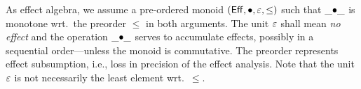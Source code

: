 \documentclass[acmsmall,review,anonymous]{acmart}\settopmatter{printfolios=true,printccs=false,printacmref=false}
\begin{document}
\newcommand{\tTm}{\mathsf{Tm}}
\newcommand{\Tm}[1]{\tTm^{#1}}
\newcommand{\PTm}{\Tm+}
\newcommand{\NTm}{\Tm-}
\newcommand{\tthunk}{\mathsf{thunk}}
\newcommand{\thunk}[1]{\tthunk\,#1}
\newcommand{\tforce}{\mathsf{force}}
\newcommand{\force}[1]{\tforce\,#1}
\newcommand{\tin}[1]{\mathsf{in}_{#1}}
\newcommand{\inj}[2]{\tin{#1}\,#2}
\newcommand{\ttup}[1]{\mathsf{tup}^{#1}}
\newcommand{\tup}[2]{\ttup{#1}\,{#2}}
\newcommand{\ptup}[1]{\ttup\,{#1}}
\newcommand{\ntup}[1]{\ttup{-}\,{#1}}
\newcommand{\tret}{\mathsf{ret}}
\newcommand{\ret}[1]{\tret\,#1}
\newcommand{\vlet}[3]{#2\,{\mathsf{be}}\,#1.\,#3}
\newcommand{\bind}[3]{#2\,{\mathsf{to}}\,#1.\,#3}
\newcommand{\tsplit}{\mathsf{split}}
\newcommand{\splits}[3]{#1\,{\tsplit}\,#2.\,#3}
\newcommand{\tcases}{\mathsf{cases}}
\newcommand{\case}[2]{#1\,{\tcases}\,\{#2\}}
\newcommand{\caser}[2]{#1\,{\tcases}\,#2}
\newcommand{\lam}[2]{\lambda#1.\,#2}
\newcommand{\app}[2]{#1\,#2}
\newcommand{\trecord}{\mathsf{record}}
\newcommand{\recrd}[2]{\trecord_{#1}\,#2}
\newcommand{\record}[2]{\trecord_{#1}\{#2\}}
\newcommand{\tproj}{\mathsf{proj}}
\newcommand{\proj}[2]{\tproj_{#1}\,{#2}}

\newcommand{\ValTy}[3]{#1 \vdash #2 : #3}
\newcommand{\CompTy}[4]{#1 \vdash #2 : #4 \mid #3}
\newcommand{\ru}{\dfrac}
\newcommand{\nru}[3]{#1\;\dfrac{#2}{#3}}
\newcommand{\nrux}[4]{#1\;\dfrac{#2}{#3}\;#4}

\newcommand{\rulename}[1]{\ensuremath{\mbox{\textsc{#1}}}\xspace}
\newcommand{\rintro}[1]{\ensuremath{\mathord{#1}\mbox{-\rulename{intro}}}}
\newcommand{\relim}[1]{\ensuremath{\mathord{#1}\mbox{-\rulename{elim}}}}
\newcommand{\rvar}{\rulename{var}}
\newcommand{\rlet}{\rulename{let}}
\newcommand{\rsub}{\rulename{sub}}

As effect algebra, we assume a pre-ordered monoid
$(\mathsf{Eff},\bullet,\varepsilon,\leq)$ such that $\_{\bullet}\_$ is monotone wrt.\ the
preorder $\leq$ in both arguments.  The unit $\varepsilon$ shall mean \emph{no
  effect} and the operation $\_{\bullet}\_$ serves to accumulate effects,
possibly in a sequential order---unless the monoid is commutative.  The
preorder represents effect subsumption, i.e., loss in precision of the
effect analysis.  Note that the unit $\varepsilon$ is not necessarily the least element
wrt.\ $\leq$.
\end{document}

